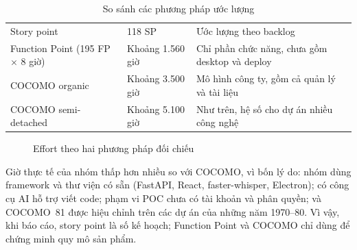 \documentclass[12pt,a4paper]{report}
\begin{document}
\begin{table}[htbp]
  \centering
  \caption{So sánh các phương pháp ước lượng}
  \label{tab:effort-compare}
  \begin{tabularx}{\linewidth}{@{}P{5.6cm}P{3.4cm}L@{}}
    \toprule
     &  &  \\
    \midrule
    Story point & 118 SP & Ước lượng theo backlog \\
    Function Point (195 FP $\times$ 8 giờ) & Khoảng 1.560 giờ & Chỉ phần chức năng, chưa gồm desktop và deploy \\
    COCOMO organic & Khoảng 3.500 giờ & Mô hình công ty, gồm cả quản lý và tài liệu \\
    COCOMO semi-detached & Khoảng 5.100 giờ & Như trên, hệ số cho dự án nhiều công nghệ \\
    \bottomrule
  \end{tabularx}
\end{table}

\begin{figure}[htbp]
  \centering
  \caption{Effort theo hai phương pháp đối chiếu}
  \label{fig:effort-compare}
\end{figure}

Giờ thực tế của nhóm thấp hơn nhiều so với COCOMO, vì bốn lý do: nhóm dùng framework và thư viện có sẵn (FastAPI,
React, faster-whisper, Electron); có công cụ AI hỗ trợ viết code; phạm vi POC chưa có tài khoản và phân quyền; và
COCOMO~81 được hiệu chỉnh trên các dự án của những năm 1970--80. Vì vậy, khi báo cáo, story point là số kế hoạch;
Function Point và COCOMO chỉ dùng để chứng minh quy mô sản phẩm.
\end{document}
